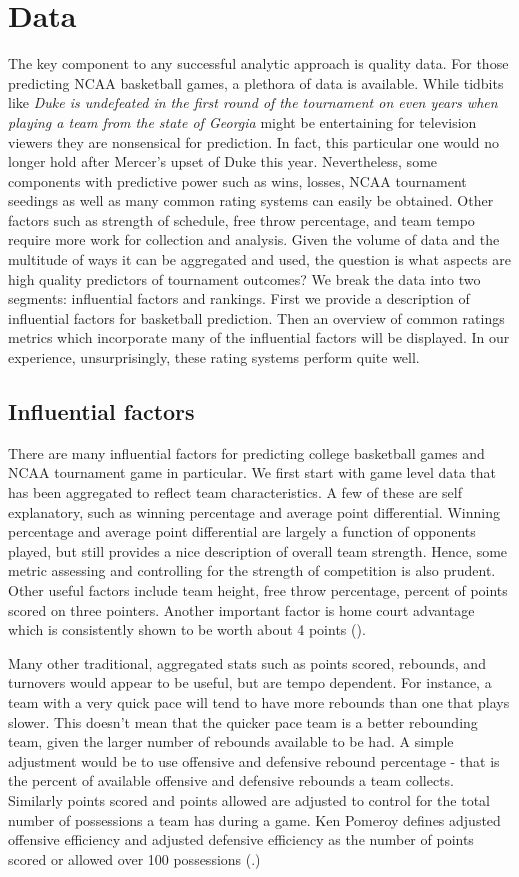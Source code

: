 \section{Data}
The key component to any successful analytic approach is quality data.  For those predicting NCAA basketball games, a plethora of data is available. While tidbits like \emph{Duke is undefeated in the first round of the tournament on even years when playing a team from the state of Georgia} might be entertaining for television viewers they are nonsensical for prediction.  In fact, this particular one would no longer hold after Mercer's upset of Duke this year. Nevertheless, some components with predictive power such as wins, losses, NCAA tournament seedings as well as many common rating systems can easily be obtained. Other factors such as strength of schedule, free throw percentage, and team tempo require more work for collection and analysis. Given the volume of data and the multitude of ways it can be aggregated and used, the question is what aspects are high quality predictors of tournament outcomes? We break the data into two segments: influential factors and rankings. First we provide a description of influential factors for basketball prediction. Then an overview of common ratings metrics which incorporate many of the influential factors will be displayed. In our experience, unsurprisingly, these rating systems perform quite well.

\subsection{Influential factors} 
There are many influential factors for predicting college basketball games and NCAA tournament game in particular. We first start with game level data that has been aggregated to reflect team characteristics. A few of these are self explanatory, such as winning percentage and average point differential. Winning percentage and average point differential are largely a function of opponents played, but still provides a nice description of overall team strength. Hence, some metric assessing and controlling for the strength of competition is also prudent. Other useful factors include team height, free throw percentage, percent of points scored on three pointers. Another important factor is home court advantage which is consistently shown to be worth about 4 points (\cite{harville1994}).  

Many other traditional, aggregated stats such as points scored, rebounds, and turnovers would appear to be useful, but are  tempo dependent. For instance, a team with a very quick pace will tend to have more rebounds than one that plays slower. This doesn't mean that the quicker pace team is a better rebounding team, given the larger number of rebounds available to be had. A simple adjustment would be to use offensive and defensive rebound percentage - that is the percent of available offensive and defensive rebounds a team collects. Similarly points scored and points allowed are adjusted to control for the total number of possessions a team has during a game.  Ken Pomeroy defines adjusted offensive efficiency and adjusted defensive efficiency as the number of points scored or allowed over 100 possessions (\cite{kenpom.com}.)

